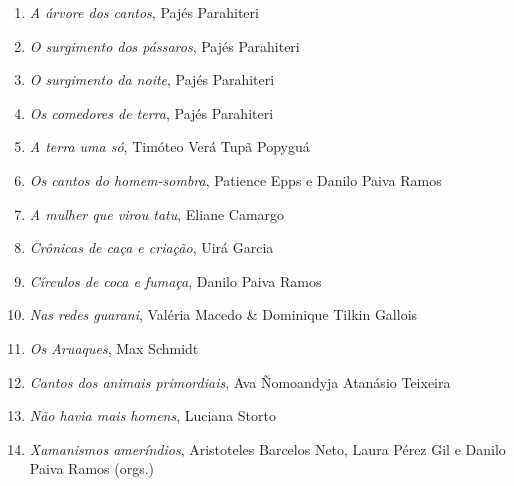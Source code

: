 \begin{enumerate}
\setlength\parskip{4.2pt}
\setlength\itemsep{-1.4mm}
\item \textit{A árvore dos cantos}, Pajés Parahiteri
\item \textit{O surgimento dos pássaros}, Pajés Parahiteri
\item \textit{O surgimento da noite}, Pajés Parahiteri
\item \textit{Os comedores de terra}, Pajés Parahiteri
\item \textit{A terra uma só}, Timóteo Verá Tupã Popyguá
\item \textit{Os cantos do homem-sombra}, Patience Epps e Danilo Paiva Ramos
\item \textit{A mulher que virou tatu}, Eliane Camargo
\item \textit{Crônicas de caça e criação}, Uirá Garcia
\item \textit{Círculos de coca e fumaça}, Danilo Paiva Ramos
\item \textit{Nas redes guarani}, Valéria Macedo \& Dominique Tilkin Gallois
\item \textit{Os Aruaques}, Max Schmidt
\item \textit{Cantos dos animais primordiais}, Ava Ñomoandyja Atanásio Teixeira
\item \textit{Não havia mais homens}, Luciana Storto
\item \textit{Xamanismos ameríndios}, Aristoteles Barcelos Neto, Laura Pérez Gil e Danilo Paiva Ramos (orgs.)
\end{enumerate}





